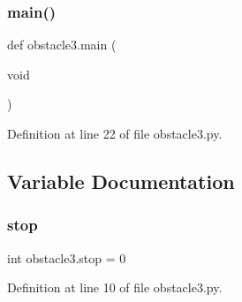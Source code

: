 \subsubsection{\texorpdfstring{main()}{main()}}
{\footnotesize\ttfamily def obstacle3.\+main (\begin{DoxyParamCaption}\item[{void}]{ }\end{DoxyParamCaption})}



Definition at line 22 of file obstacle3.\+py.



\subsection{Variable Documentation}
\mbox{\label{namespaceobstacle3_a3527e7f5b88d99da51b161c1816d86c9}} 
\subsubsection{\texorpdfstring{stop}{stop}}
{\footnotesize\ttfamily int obstacle3.\+stop = 0}



Definition at line 10 of file obstacle3.\+py.

